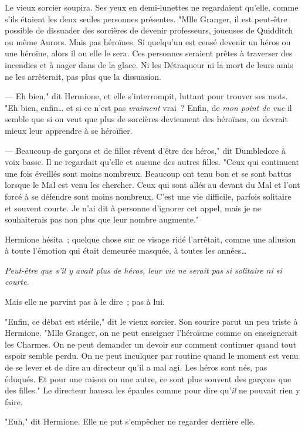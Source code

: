 Le vieux sorcier soupira. Ses yeux en demi-lunettes ne regardaient qu'elle, comme s'ils étaient les deux seules personnes présentes. "Mlle Granger, il est peut-être possible de dissuader des sorcières de devenir professeurs, joueuses de Quidditch ou même Aurors. Mais pas héroïnes. Si quelqu'un est censé devenir un héros ou une héroïne, alors il ou elle le sera. Ces personnes seraient prêtes à traverser des incendies et à nager dans de la glace. Ni les Détraqueur ni la mort de leurs amis ne les arrêterait, pas plus que la dissuasion.

--- Eh bien," dit Hermione, et elle s'interrompit, luttant pour trouver ses mots. "Eh bien, enfin… et si ce n'est pas \emph{vraiment} vrai~? Enfin, de \emph{mon point de vue} il semble que si on veut que plus de sorcières deviennent des héroïnes, on devrait mieux leur apprendre à se héroïfier.

--- Beaucoup de garçons et de filles rêvent d'être des héros," dit Dumbledore à voix basse. Il ne regardait qu'elle et aucune des autres filles. "Ceux qui continuent une fois éveillés sont moins nombreux. Beaucoup ont tenu bon et se sont battus lorsque le Mal est venu les chercher. Ceux qui sont allés au devant du Mal et l'ont forcé à se défendre sont moins nombreux. C'est une vie difficile, parfois solitaire et souvent courte. Je n'ai dit à personne d'ignorer cet appel, mais je ne souhaiterais pas non plus que leur nombre augmente."

Hermione hésita~; quelque chose sur ce visage ridé l'arrêtait, comme une allusion à toute l'émotion qui était demeurée masquée, à toutes les années…

\emph{Peut-être que s'il y avait plus de héros, leur vie ne serait pas si solitaire ni si courte.}

Mais elle ne parvint pas à le dire~; pas à lui.

"Enfin, ce débat est stérile," dit le vieux sorcier. Son sourire parut un peu triste à Hermione. "Mlle Granger, on ne peut enseigner l'héroïsme comme on enseignerait les Charmes. On ne peut demander un devoir sur comment continuer quand tout espoir semble perdu. On ne peut inculquer par routine quand le moment est venu de se lever et de dire au directeur qu'il a mal agi. Les héros sont nés, pas éduqués. Et pour une raison ou une autre, ce sont plus souvent des garçons que des filles." Le directeur haussa les épaules comme pour dire qu'\emph{il} ne pouvait rien y faire.

"Euh," dit Hermione. Elle ne put s'empêcher ne regarder derrière elle.

